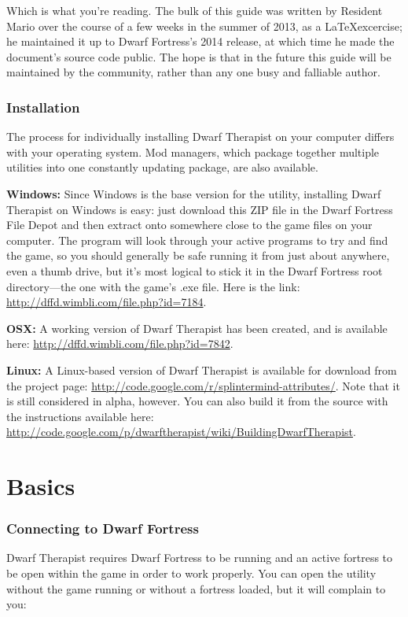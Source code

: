 \documentclass[]{article}
\begin{document}
Which is what you're reading. The bulk of this guide was written by Resident Mario over the
course of a few weeks in the summer of 2013, as a \LaTeX \space excercise; he maintained it up to Dwarf
Fortress's 2014 release, at which time he made the document's source code public. The hope is
that in the future this guide will be maintained by the community, rather than any one busy and
falliable author.\newpage

\section{Installation}
\label{sec:Installation}
The process for individually installing Dwarf Therapist on your computer differs with your operating
system. Mod managers, which package together multiple utilities into one constantly updating package,
are also available.

\vspace{12pt}

\indent\textbf{Windows:} Since Windows is the base version for the utility, installing Dwarf Therapist on
Windows is easy: just download this ZIP file in the Dwarf Fortress File Depot and then extract onto
somewhere close to the game files on your computer. The program will look through your active programs to
try and find the game, so you should generally be safe running it from just about anywhere, even a thumb
drive, but it's most logical to stick it in the Dwarf Fortress root directory---the one with the game's
.exe file. Here is the link: \url{http://dffd.wimbli.com/file.php?id=7184}.
\vspace{12pt}

\textbf{OSX:}
A working version of Dwarf Therapist has been created, and is available here:
\url{http://dffd.wimbli.com/file.php?id=7842}.
\vspace{12pt}

\textbf{Linux:}
A Linux-based version of Dwarf Therapist is available for download from the project page:
\url{http://code.google.com/r/splintermind-attributes/}. Note that it is still considered in alpha,
however. You can also build it from the source with the instructions available here:
\url{http://code.google.com/p/dwarftherapist/wiki/BuildingDwarfTherapist}.

\newpage

\part{Basics}
\section{Connecting to Dwarf Fortress}
\label{sec:Connecting to Dwarf Fortress}
Dwarf Therapist requires Dwarf Fortress to be running and an active fortress to be open within the game
in order to work properly. You can open the utility without the game running or without a fortress
loaded, but it will complain to you:
\end{document}
